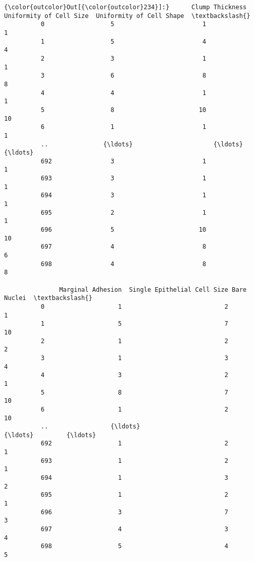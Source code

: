\documentclass[11pt]{article}
\begin{document}
\begin{Verbatim}[commandchars=\\\{\}]
{\color{outcolor}Out[{\color{outcolor}234}]:}      Clump Thickness  Uniformity of Cell Size  Uniformity of Cell Shape  \textbackslash{}
          0                  5                        1                         1   
          1                  5                        4                         4   
          2                  3                        1                         1   
          3                  6                        8                         8   
          4                  4                        1                         1   
          5                  8                       10                        10   
          6                  1                        1                         1   
          ..               {\ldots}                      {\ldots}                       {\ldots}   
          692                3                        1                         1   
          693                3                        1                         1   
          694                3                        1                         1   
          695                2                        1                         1   
          696                5                       10                        10   
          697                4                        8                         6   
          698                4                        8                         8   
          
               Marginal Adhesion  Single Epithelial Cell Size Bare Nuclei  \textbackslash{}
          0                    1                            2           1   
          1                    5                            7          10   
          2                    1                            2           2   
          3                    1                            3           4   
          4                    3                            2           1   
          5                    8                            7          10   
          6                    1                            2          10   
          ..                 {\ldots}                          {\ldots}         {\ldots}   
          692                  1                            2           1   
          693                  1                            2           1   
          694                  1                            3           2   
          695                  1                            2           1   
          696                  3                            7           3   
          697                  4                            3           4   
          698                  5                            4           5   
          

\end{Verbatim}
\end{document}

